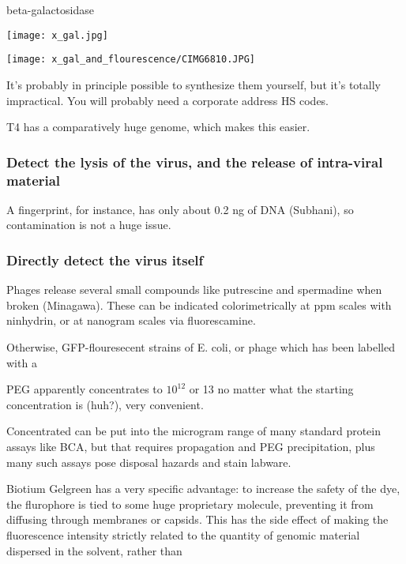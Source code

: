 \documentclass[paper.tex]{subfiles}
\begin{document}
beta-galactosidase



\texttt{[image: x\_gal.jpg]}

\texttt{[image: x\_gal\_and\_flourescence/CIMG6810.JPG]}

 It’s probably in principle possible to synthesize them yourself, but it’s totally impractical. You will probably need a corporate address HS codes. 

T4 has a comparatively huge genome, which makes this easier.


\subsubsection{Detect the lysis of the virus, and the release of intra-viral material}

A fingerprint, for instance, has only about 0.2 ng of DNA (Subhani), so contamination is not a huge issue.

\subsubsection{Directly detect the virus itself}

Phages release several small compounds like putrescine and spermadine when broken (Minagawa\cite{characteristics1961}). These can be indicated colorimetrically at ppm scales with ninhydrin, or at nanogram scales via fluorescamine. 

Otherwise, GFP-flouresecent strains of E. coli, or phage which has been labelled with a 




PEG apparently concentrates to $10^{12}$ or 13 no matter what the starting concentration is (huh?), very convenient.

Concentrated can be put into the microgram range of many standard protein assays like BCA, but that requires propagation and PEG precipitation, plus many such assays pose disposal hazards and stain labware. 












Biotium Gelgreen has a very specific advantage: to increase the safety of the dye, the flurophore is tied to some huge proprietary molecule, preventing it from diffusing through membranes or capsids. This has the side effect of making the fluorescence intensity strictly related to the quantity of genomic material dispersed in the solvent, rather than 
\end{document}
